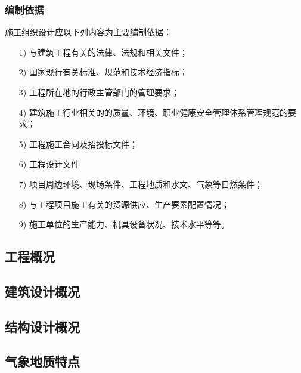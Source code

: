 \subsubsection{编制依据}

施工组织设计应以下列内容为主要编制依据：

\begin{itemize}

    \item [1)] 与建筑工程有关的法律、法规和相关文件；

    \item [2)] 国家现行有关标准、规范和技术经济指标；

    \item [3)] 工程所在地的行政主管部门的管理要求；

    \item [4)] 建筑施工行业相关的的质量、环境、职业健康安全管理体系管理规范的要求；

    \item [5)] 工程施工合同及招投标文件；

    \item [6)] 工程设计文件

    \item [7)] 项目周边环境、现场条件、工程地质和水文、气象等自然条件；

    \item [8)] 与工程项目施工有关的资源供应、生产要素配置情况；

    \item [9)] 施工单位的生产能力、机具设备状况、技术水平等等。
    
\end{itemize}

\subsection{工程概况}
\subsection{建筑设计概况}
\subsection{结构设计概况}
\subsection{气象地质特点}

